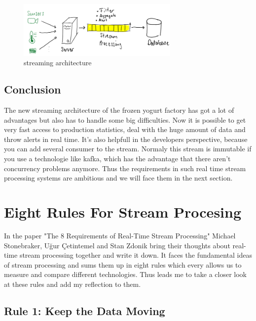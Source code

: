 \begin{figure}[H]
\centering
\captionsetup{justification=centering}
\includegraphics[width=0.7\textwidth]{images/stream.png}
\caption[streaming architecture]{streaming architecture}
\end{figure}

\newpage

\subsection{Conclusion}
The new streaming architecture of the frozen yogurt factory has got a lot of advantages but also has to handle some big difficulties.
Now it is possible to get very fast access to production statistics, deal with the huge amount of data and throw alerts in real time.
It's also helpfull in the developers perspective, because you can add several consumer to the stream.
Normaly this stream is immutable if you use a technologie like kafka, which has the advantage that there aren't concurrency problems anymore.
Thus the requirements in such real time stream processing systems are ambitious and we will face them in the next section.

\newpage

\section{Eight Rules For Stream Procesing}
In the paper "The 8 Requirements of Real-Time Stream Processing" Michael Stonebraker, Uğur Çetintemel and Stan Zdonik
bring their thoughts about real-time stream processing together and write it down. It faces the fundamental ideas of stream processing
and sums them up in eight rules which every allows us to measure and compare different technologies.
Thus leads me to take a closer look at these rules and add my reflection to them.

\subsection{Rule 1: Keep the Data Moving}




